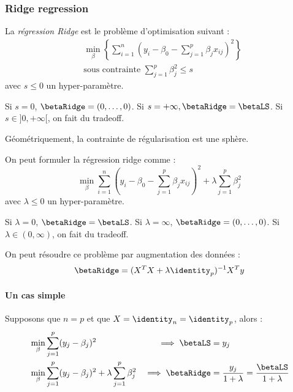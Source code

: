         \subsubsection{Ridge regression}
            \begin{definition}
                La \textit{régression Ridge} est le problème d'optimisation suivant :
                \begin{align*}
                    &\min_{\beta} \left\{\sum_{i=1}^n \left(y_i - \beta_0 - \sum_{j=1}^p \beta_j x_{ij}\right)^2\right\}\\
                    &\text{sous contrainte } \sum_{j=1}^p \beta_j^2 \leq s
                \end{align*}
                avec \(s \leq 0\) un hyper-paramètre.

                Si \(s = 0\), \(\betaRidge = (0, \dots, 0)\). Si \(s = +\infty, \betaRidge = \betaLS\). Si \(s \in ]0, +\infty[\), on fait du tradeoff.
            \end{definition}

            Géométriquement, la contrainte de régularisation est une sphère.

            \begin{definition}
                On peut formuler la régression ridge comme :
                \[
                    \min_{\beta} \sum_{i=1}^n \left(y_i - \beta_0 - \sum_{j=1}^p \beta_j x_{ij}\right)^2 + \lambda \sum_{j=1}^p \beta_j^2
                \]
                avec \(\lambda \leq 0\) un hyper-paramètre.

                Si \(\lambda = 0\), \(\betaRidge = \betaLS\). Si \(\lambda = \infty\), \(\betaRidge = (0, \dots, 0)\). Si \(\lambda \in (0, \infty)\), on fait du tradeoff.

                On peut résoudre ce problème par augmentation des données :
                \[
                    \betaRidge = (X^T X + \lambda \identity_p)^{-1} X^T y
                \]
            \end{definition}

            \paragraph{Un cas simple}
                Supposons que \(n = p\) et que \(X = \identity_n = \identity_p\), alors :
                \begin{align*}
                    &\min_\beta \sum_{j=1}^p (y_j - \beta_j)^2 &\implies \betaLS &= y_j\\
                    &\min_\beta \sum_{j=1}^p (y_j - \beta_j)^2 + \lambda\sum_{j=1}^p \beta_j^2 &\implies \betaRidge &= \frac{y_j}{1+\lambda} = \frac{\betaLS}{1 + \lambda}
                \end{align*}


